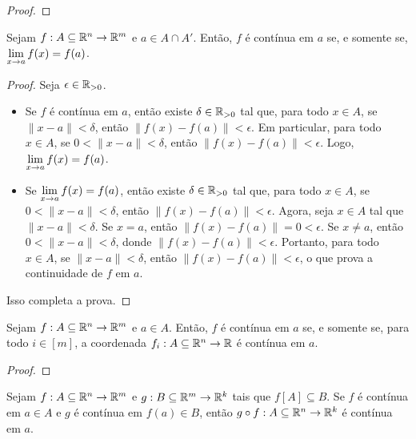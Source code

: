 \begin{proof}
    \blackproof
\end{proof}

\begin{theorem} \label{teo.calc2:continuidade_sse_limite}
    Sejam $f : A \subseteq \mathbb{R}^n \to \mathbb{R}^m$ e $a \in A \cap A'$. Então, $f$ é contínua em $a$ se, e somente se, $\displaystyle \lim_{x \to a} f(x) = f(a)$.
\end{theorem}

\begin{proof}
    Seja $\epsilon \in \mathbb{R}_{>0}$.
        \begin{itemize}[align=left]
            \item[($\Rightarrow$)] Se $f$ é contínua em $a$, então existe $\delta \in \mathbb{R}_{>0}$ tal que, para todo $x \in A$, se $\|x-a\|<\delta$, então $\|f(x) - f(a)\| < \epsilon$. Em particular, para todo $x \in A$, se $0<\|x-a\|<\delta$, então $\|f(x) - f(a)\| < \epsilon$. Logo, $\displaystyle \lim_{x \to a} f(x) = f(a)$.
            \item[($\Leftarrow$)] Se $\displaystyle \lim_{x \to a} f(x) = f(a)$, então existe $\delta \in \mathbb{R}_{>0}$ tal que, para todo $x \in A$, se $0<\|x-a\|<\delta$, então $\|f(x) - f(a)\| < \epsilon$. Agora, seja $x \in A$ tal que $\|x-a\|<\delta$. Se $x=a$, então $\|f(x) - f(a)\| = 0 < \epsilon$. Se $x \neq a$, então $0<\|x-a\|<\delta$, donde $\|f(x) - f(a)\| < \epsilon$. Portanto, para todo $x \in A$, se $\|x-a\|<\delta$, então $\|f(x) - f(a)\| < \epsilon$, o que prova a continuidade de $f$ em $a$.
        \end{itemize}
    Isso completa a prova. \blackproof
\end{proof}

\begin{proposition}
    Sejam $f : A \subseteq \mathbb{R}^n \to \mathbb{R}^m$ e $a \in A$. Então, $f$ é contínua em $a$ se, e somente se, para todo $i \in [m]$, a coordenada $f_i : A \subseteq \mathbb{R}^n \to \mathbb{R}$ é contínua em $a$.
\end{proposition}

\begin{proof}
    \blackproof
\end{proof}

\begin{proposition}
    Sejam $f : A \subseteq \mathbb{R}^n \to \mathbb{R}^m$ e $g : B \subseteq \mathbb{R}^m \to \mathbb{R}^k$ tais que $f[A] \subseteq B$. Se $f$ é contínua em $a \in A$ e $g$ é contínua em $f(a) \in B$, então $g \circ f : A \subseteq \mathbb{R}^n \to \mathbb{R}^k$ é contínua em $a$.
\end{proposition}

